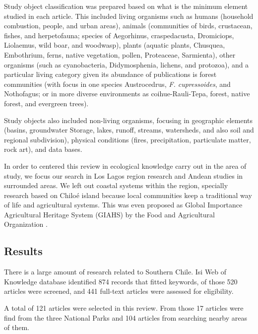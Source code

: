 \documentclass[]{article}
\begin{document}
Study object classification was prepared based on what is the minimum element studied in each article. This included living organisms such as humans (household combustion, people, and urban areas), animals (communities of birds, crustacean, fishes, and herpetofauna; species of Aegorhinus, craspedacusta, Dromiciops, Liolaemus, wild boar, and woodwasp), plants (aquatic plants, Chusquea, Embothrium, ferns, native vegetation, pollen, Proteaceae, Sarmienta), other organisms (such as cyanobacteria, Didymosphenia, lichens, and protozoa), and a particular living category given its abundance of publications is forest communities (with focus in one species Austrocedrus, \emph{F. cupressoides}, and Nothofagus; or in more diverse environments as coihue-Rauli-Tepa, forest, native forest, and evergreen trees).

Study objects also included non-living organisms, focusing in geographic elements (basins, groundwater Storage, lakes, runoff, streams, watersheds, and also soil and regional subdivision), physical conditions (fires, precipitation, particulate matter, rock art), and data bases.

In order to centered this review in ecological knowledge carry out in the area of study, we focus our search in Los Lagos region research and Andean studies in surrounded areas. We left out coastal systems within the region, specially research based on Chiloé island because local communities keep a traditional way of life and agricultural systems. This was even proposed as Global Importance Agricultural Heritage System (GIAHS) by the Food and Agricultural Organization \citep{FAO2003Chiloe, FAO2008Chiloe}.

\hypertarget{results}{%
\subsection{Results}\label{results}}

There is a large amount of research related to Southern Chile. Isi Web of Knowledge database identified 874 records that fitted keywords, of those 520 articles were screened, and 441 full-text articles were assessed for eligibility.

A total of 121 articles were selected in this review. From those 17 articles were find from the three National Parks and 104 articles from searching nearby areas of them.
\end{document}
